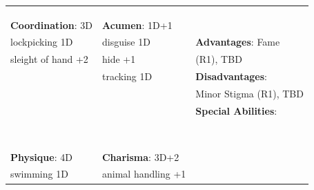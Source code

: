 \documentclass[10pt]{article}
\begin{document}
\begin{table}
\begin{tabular}{m{156pt} m{156pt} m{156pt}}
 \hrulefill &  \hrulefill & \\

 \hrulefill &  \hrulefill & \\

 \hrulefill &  \hrulefill & \\


\textbf{Coordination}: 3D \hrulefill & \textbf{Acumen}: 1D+1 \hrulefill     & \hrulefill \\

lockpicking       1D \hrulefill & disguise          1D \hrulefill & \textbf{Advantages}: Fame \hrulefill \\

sleight of hand   +2 \hrulefill & hide              +1 \hrulefill & (R1), TBD \hrulefill \\

 \hrulefill & tracking          1D \hrulefill & \textbf{Disadvantages}: \hrulefill \\

 \hrulefill &  \hrulefill & Minor Stigma (R1), TBD \hrulefill \\

 \hrulefill &  \hrulefill & \textbf{Special Abilities}: \hrulefill \\

 \hrulefill &  \hrulefill &  \hrulefill \\

 \hrulefill &  \hrulefill &  \hrulefill \\

 \hrulefill &  \hrulefill &  \hrulefill \\

 \hrulefill &  \hrulefill &  \hrulefill \\

 \hrulefill &  \hrulefill &  \hrulefill \\

 \hrulefill &  \hrulefill &  \hrulefill \\

 \hrulefill &  \hrulefill &  \hrulefill \\

 \hrulefill &  \hrulefill &  \hrulefill \\


\textbf{Physique}: 4D \hrulefill & \textbf{Charisma}: 3D+2 \hrulefill     &  \hrulefill \\

swimming          1D \hrulefill & animal handling   +1 \hrulefill &  \hrulefill \\


\end{tabular}
\end{table}
\end{document}
